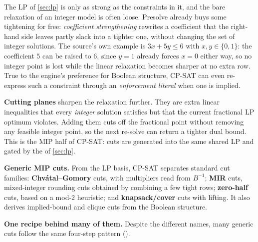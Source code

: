 The LP of \cref{sec:lp} is only as strong as the constraints in it, and
the bare relaxation of an integer model is often loose.
Presolve already buys some tightening for free: \emph{coefficient strengthening}
rewrites a coefficient that the right-hand side leaves partly slack into a
tighter one, without changing the set of integer solutions. The source's own
example is $3x + 5y \le 6$ with $x, y \in \{0,1\}$: the coefficient $5$ can be
raised to $6$, since $y = 1$ already forces $x = 0$ either way, so no integer
point is lost while the linear relaxation becomes sharper at no extra row. True
to the engine's preference for Boolean structure, CP-SAT can even re-express
such a constraint through an \emph{enforcement literal} when one is implied.

\textbf{Cutting planes} sharpen the relaxation further. They are extra linear
inequalities that every \emph{integer} solution satisfies but that the current
fractional LP optimum violates. Adding them cuts off the fractional point without
removing any feasible integer point, so the next re-solve can return a tighter
dual bound. This is the MIP half of CP-SAT: cuts are generated into the same
shared LP and gated by the  of \cref{sec:lp}.

\textbf{Generic MIP cuts.} From the LP basis, CP-SAT separates standard cut
families: \textbf{Chvátal--Gomory} cuts, with multipliers read from $B^{-1}$;
\textbf{MIR} cuts, mixed-integer rounding cuts obtained by combining a few tight
rows; \textbf{zero-half} cuts, based on a mod-2 heuristic; and
\textbf{knapsack/cover} cuts with lifting. It also derives implied-bound and
clique cuts from the Boolean structure.

\textbf{One recipe behind many of them.} Despite the different names, many
generic cuts follow the same four-step pattern ().


